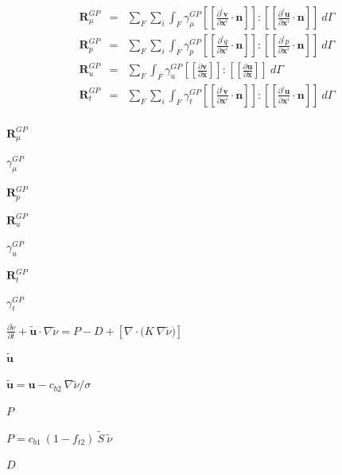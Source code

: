 \documentclass{article}
\begin{document}
\[
\begin{array}{lll}
\mathbf{R}_{\mu}^{GP} & = & \displaystyle
\sum_{F} \sum_{i} \int_{F} \gamma_{\mu}^{GP} [[ \frac{\partial^i \mathbf{v}}{\partial \mathbf{x}^i} \cdot \mathbf{n} ]] 
: [[ \frac{\partial^i \mathbf{u}}{\partial \mathbf{x}^i} \cdot \mathbf{n} ]]\ d\Gamma\\[15pt]

\mathbf{R}_{p}^{GP} & = & \displaystyle
\sum_{F} \sum_{i} \int_{F} \gamma_{p}^{GP} [[ \frac{\partial^i q}{\partial \mathbf{x}^i} \cdot \mathbf{n} ]] 
: [[ \frac{\partial^i p}{\partial \mathbf{x}^i} \cdot \mathbf{n} ]]\ d\Gamma\\[15pt]

\mathbf{R}_{u}^{GP} & = & \displaystyle
\sum_{F} \int_{F} \gamma_{u}^{GP} [[ \frac{\partial \mathbf{v}}{\partial \mathbf{x}} ]] 
: [[ \frac{\partial \mathbf{u}}{\partial \mathbf{x}} ]]\ d\Gamma\\[15pt]

\mathbf{R}_{t}^{GP} & = & \displaystyle
\sum_{F} \sum_{i} \int_{F} \gamma_{t}^{GP} [[ \frac{\partial^i \mathbf{v}}{\partial \mathbf{x}^i} \cdot \mathbf{n} ]] 
: [[ \frac{\partial^i \mathbf{u}}{\partial \mathbf{x}^i} \cdot \mathbf{n} ]]\ d\Gamma\\

\end{array}
\]
\pagebreak

$ \mathbf{R}_{\mu}^{GP} $
\pagebreak

$ \gamma_{\mu}^{GP} $
\pagebreak

$ \mathbf{R}_{p}^{GP} $
\pagebreak

$ \mathbf{R}_{u}^{GP} $
\pagebreak

$ \gamma_{u}^{GP} $
\pagebreak

$ \mathbf{R}_{t}^{GP} $
\pagebreak

$ \gamma_{t}^{GP} $
\pagebreak

$
\displaystyle
\frac{\partial \tilde{\nu}}{\partial t} 
+ \tilde{\mathbf{u}} \cdot \nabla \tilde{\nu} 
= P
- D
+ \left[ \nabla \cdot \bigg( K\ \nabla \tilde{\nu} \bigg) \right]
$
\pagebreak

$ \tilde{\mathbf{u}} $
\pagebreak

$ \tilde{\mathbf{u}} = \mathbf{u} - c_{b2}\ \nabla \tilde{\nu} / \sigma $
\pagebreak

$ P $
\pagebreak

$ P = c_{b1}\ (1-f_{t2})\ \tilde{S}\ \tilde{\nu} $
\pagebreak

$ D $
\pagebreak
\end{document}
